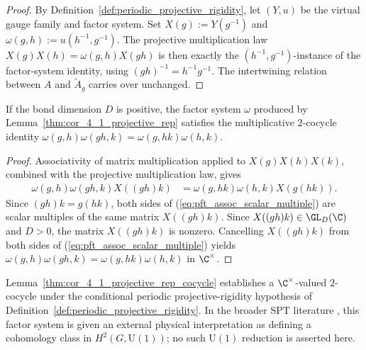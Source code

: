 \begin{proof}\leanok
    By Definition~\ref{def:periodic_projective_rigidity}, let $(Y, u)$ be the
    virtual gauge family and factor system. Set
    $X(g) := Y(g^{-1})$ and $\omega(g, h) := u(h^{-1}, g^{-1})$. The
    projective multiplication law $X(g)X(h) = \omega(g,h)X(gh)$
    is then exactly the $(h^{-1}, g^{-1})$-instance of the factor-system
    identity, using $(gh)^{-1} = h^{-1}g^{-1}$. The intertwining
    relation between $A$ and $\widetilde{A}_g$ carries over unchanged.
\end{proof}

\begin{lemma}%
    \label{thm:cor_4_1_projective_rep_cocycle}
    \leanok
    If the bond dimension $D$ is positive, the factor system $\omega$
    produced by Lemma~\ref{thm:cor_4_1_projective_rep} satisfies the
    multiplicative $2$-cocycle identity
    $\omega(g,h)\omega(gh,k) = \omega(g,hk)\omega(h,k)$.
\end{lemma}

\begin{proof}\leanok
    Associativity of matrix multiplication applied to
    $X(g)X(h)X(k)$, combined with the projective multiplication
    law, gives
    \begin{align}
        \omega(g,h)\omega(gh,k)X((gh)k)
         & =\omega(g,hk)\omega(h,k)X(g(hk)).
        \label{eq:pft_assoc_scalar_multiple}
    \end{align}
    Since $(gh)k = g(hk)$, both sides of
    (\ref{eq:pft_assoc_scalar_multiple}) are scalar multiples of the
    same matrix $X((gh)k)$. Since $X((gh)k) \in \GL_D(\C)$ and $D>0$,
    the matrix $X((gh)k)$ is nonzero. Cancelling $X((gh)k)$ from both sides of
    (\ref{eq:pft_assoc_scalar_multiple}) yields
    $\omega(g,h)\omega(gh,k) = \omega(g,hk)\omega(h,k)$ in $\C^{\times}$.
\end{proof}

\begin{remark}%
    \label{rem:cor_4_1_projective_rep_spt}
    Lemma~\ref{thm:cor_4_1_projective_rep_cocycle} establishes a $\C^\times$-valued
    $2$-cocycle under the conditional periodic projective-rigidity hypothesis of
    Definition~\ref{def:periodic_projective_rigidity}. In the broader SPT
    literature \cite{PerezGarcia2008StringOrder,Schuch2011Phases}, this factor
    system is given an external physical interpretation as defining a
    cohomology class in $H^2(G,\mathrm{U}(1))$; no such $\mathrm{U}(1)$ reduction is asserted
    here.
\end{remark}

